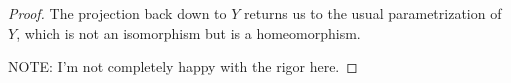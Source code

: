 \begin{proof}
    The projection back down to $Y$ returns us to the usual parametrization of $Y$, which is not an isomorphism but is a homeomorphism.

    NOTE: I'm not completely happy with the rigor here.
\end{proof}
